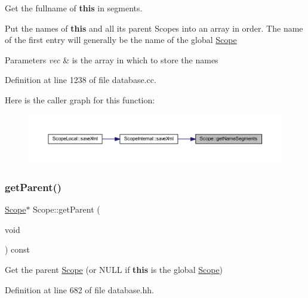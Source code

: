 Get the fullname of {\bfseries{this}} in segments. 

Put the names of {\bfseries{this}} and all its parent Scopes into an array in order. The name of the first entry will generally be the name of the global \mbox{\hyperlink{class_scope}{Scope}} 
\begin{DoxyParams}{Parameters}
{\em vec} & is the array in which to store the names \\
\hline
\end{DoxyParams}


Definition at line 1238 of file database.\+cc.

Here is the caller graph for this function\+:
\nopagebreak
\begin{figure}[H]
\begin{center}
\leavevmode
\includegraphics[width=350pt]{class_scope_a0d0befa1009748f0af39a1e6b7704b7b_icgraph}
\end{center}
\end{figure}
\mbox{\label{class_scope_ab89674324e529aa340dd8b781a12aa58}} 
\subsubsection{\texorpdfstring{getParent()}{getParent()}}
{\footnotesize\ttfamily \mbox{\hyperlink{class_scope}{Scope}}$\ast$ Scope\+::get\+Parent (\begin{DoxyParamCaption}\item[{void}]{ }\end{DoxyParamCaption}) const\hspace{0.3cm}{\ttfamily [inline]}}



Get the parent \mbox{\hyperlink{class_scope}{Scope}} (or N\+U\+LL if {\bfseries{this}} is the global \mbox{\hyperlink{class_scope}{Scope}}) 



Definition at line 682 of file database.\+hh.

